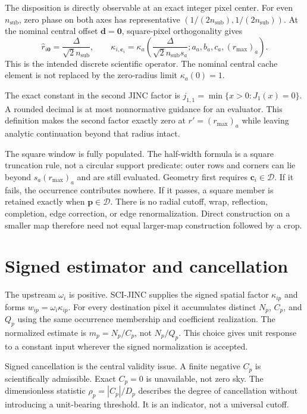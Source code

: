 \documentclass[11pt]{article}
\begin{document}
The disposition is directly observable at an exact integer pixel center.
For even $n_{\mathrm{sub}}$, zero phase on both axes has representative
$(1/(2n_{\mathrm{sub}}),1/(2n_{\mathrm{sub}}))$.  At the nominal central
offset $\boldsymbol d=\boldsymbol0$, square-pixel orthogonality gives
\[
 \widehat r_{i\boldsymbol0}=\frac{\Delta}{\sqrt{2}n_{\mathrm{sub}}},
 \qquad
 \kappa_{i,\boldsymbol c_i}=\kappa_a\!\left(
 \frac{\Delta}{\sqrt{2}n_{\mathrm{sub}}s_a};
 a_a,b_a,c_a,(r_{\max})_a\right).
\]
This is the intended discrete scientific operator.  The nominal central
cache element is not replaced by the zero-radius limit $\kappa_a(0)=1$.

The exact constant in the second JINC factor is
$j_{1,1}=\min\{x>0:J_1(x)=0\}$.  A rounded decimal is at most nonnormative
guidance for an evaluator.  This definition makes the second factor exactly
zero at $r'=(r_{\max})_a$ while leaving analytic continuation beyond that
radius intact.

The square window is fully populated.  The half-width formula is a square
truncation rule, not a circular support predicate: outer rows and corners can
lie beyond $s_a(r_{\max})_a$ and are still evaluated.  Geometry first requires
$\boldsymbol c_i\in\mathcal D$.  If it fails, the occurrence contributes nowhere.
If it passes, a square member is retained exactly when
$\boldsymbol p\in\mathcal D$.  There is no radial cutoff, wrap, reflection,
completion, edge correction, or edge renormalization.  Direct construction on
a smaller map therefore need not equal larger-map construction followed by a
crop.

\section{Signed estimator and cancellation}
\label{sec:estimator-narrative}

The upstream $\omega_i$ is positive.  SCI-JINC supplies the signed spatial
factor $\kappa_{ip}$ and forms $w_{ip}=\omega_i\kappa_{ip}$.  For every
destination pixel it accumulates distinct $N_p$, $C_p$, and $Q_p$ using the
same occurrence membership and coefficient realization.  The normalized
estimate is $m_p=N_p/C_p$, not $N_p/Q_p$.  This choice gives unit response to a
constant input wherever the signed normalization is accepted.

Signed cancellation is the central validity issue.  A finite negative $C_p$
is scientifically admissible.  Exact $C_p=0$ is unavailable, not zero sky.
The dimensionless statistic $\rho_p=|C_p|/D_p$ describes the degree of
cancellation without introducing a unit-bearing threshold.  It is an
indicator, not a universal cutoff.
\end{document}
